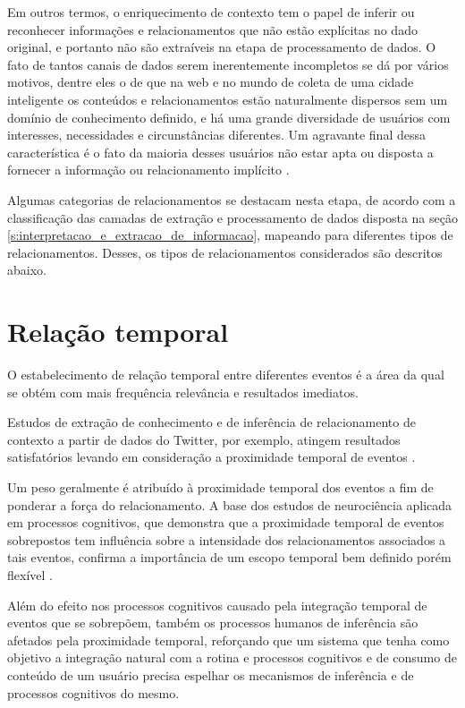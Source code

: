 Em outros termos, o enriquecimento de contexto tem o papel de inferir ou reconhecer informações e relacionamentos que não estão explícitas no dado original, e portanto não são extraíveis na etapa de processamento de dados. O fato de tantos canais de dados serem inerentemente incompletos se dá por vários motivos, dentre eles o de que na web e no mundo de coleta de uma cidade inteligente os conteúdos e relacionamentos estão naturalmente dispersos sem um domínio de conhecimento definido, e há uma grande diversidade de usuários com interesses, necessidades e circunstâncias diferentes. Um agravante final dessa característica é o fato da maioria desses usuários não estar apta ou disposta a fornecer a informação ou relacionamento implícito \cite{moreira2014sistema}.

Algumas categorias de relacionamentos se destacam nesta etapa, de acordo com a classificação das camadas de extração e processamento de dados disposta na seção \ref{s:interpretacao_e_extracao_de_informacao}, mapeando para diferentes tipos de relacionamentos. Desses, os tipos de relacionamentos considerados são descritos abaixo.

\section{Relação temporal}

O estabelecimento de relação temporal entre diferentes eventos é a área da qual se obtém com mais frequência relevância e resultados imediatos.

Estudos de extração de conhecimento e de inferência de relacionamento de contexto a partir de dados do Twitter, por exemplo, atingem resultados satisfatórios levando em consideração a proximidade temporal de eventos \cite{extracting:fromtwitter}.

Um peso geralmente é atribuído à proximidade temporal dos eventos a fim de ponderar a força do relacionamento. A base dos estudos de neurociência aplicada em processos cognitivos, que demonstra que a proximidade temporal de eventos sobrepostos tem influência sobre a intensidade dos relacionamentos associados a tais eventos, confirma a importância de um escopo temporal bem definido porém flexível \cite{Zeithamova2017TemporalPP}.

Além do efeito nos processos cognitivos causado pela integração temporal de eventos que se sobrepõem, também os processos humanos de inferência são afetados pela proximidade temporal, reforçando que um sistema que tenha como objetivo a integração natural com a rotina e processos cognitivos e de consumo de conteúdo de um usuário precisa espelhar os mecanismos de inferência e de processos cognitivos do mesmo.


